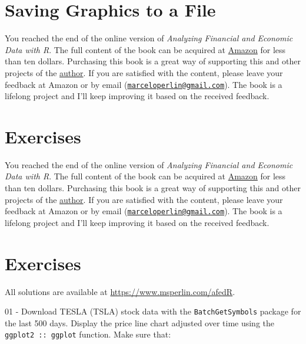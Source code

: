 \documentclass[
  12pt,
]{book}
\newenvironment{pleasebuyit}
{\begin{noteblock}
		
	} {\end{noteblock}}
\begin{document}
\hypertarget{saving-graphics-to-a-file}{%
\section{Saving Graphics to a File}\label{saving-graphics-to-a-file}}

\begin{pleasebuyit}
You reached the end of the online version of \emph{Analyzing Financial
and Economic Data with R}. The full content of the book can be acquired
at \href{https://www.amazon.com/dp/B084LSNXMN}{Amazon} for less than ten
dollars. Purchasing this book is a great way of supporting this and
other projects of the \href{https://www.msperlin.com/blog/}{author}. If
you are satisfied with the content, please leave your feedback at Amazon
or by email
(\href{mailto:marceloperlin@gmail.com}{\nolinkurl{marceloperlin@gmail.com}}).
The book is a lifelong project and I'll keep improving it based on the
received feedback.
\end{pleasebuyit}

\hypertarget{exercises-9}{%
\section{Exercises}\label{exercises-9}}

\begin{pleasebuyit}
You reached the end of the online version of \emph{Analyzing Financial
and Economic Data with R}. The full content of the book can be acquired
at \href{https://www.amazon.com/dp/B084LSNXMN}{Amazon} for less than ten
dollars. Purchasing this book is a great way of supporting this and
other projects of the \href{https://www.msperlin.com/blog/}{author}. If
you are satisfied with the content, please leave your feedback at Amazon
or by email
(\href{mailto:marceloperlin@gmail.com}{\nolinkurl{marceloperlin@gmail.com}}).
The book is a lifelong project and I'll keep improving it based on the
received feedback.
\end{pleasebuyit}

\hypertarget{exercises-10}{%
\section{Exercises}\label{exercises-10}}

All solutions are available at \url{https://www.msperlin.com/afedR}.

01 -
Download TESLA (TSLA) stock data with the \texttt{BatchGetSymbols} package for the last 500 days. Display the price line chart adjusted over time using the \texttt{ggplot2\ ::\ ggplot} function. Make sure that:
\end{document}
